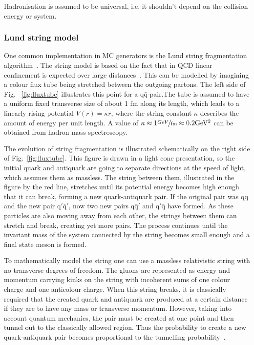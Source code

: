 Hadronisation is assumed to be universal, i.e. it shouldn't depend on the collision energy or system. 

\subsubsection*{Lund string model}

One common implementation in MC generators is the Lund string fragmentation algorithm~\cite{ANDERSSON198331}. The string model is based on the fact that in QCD linear confinement is expected over large distances~\cite{eventGenerators}. This can be modelled by imagining a colour flux tube being stretched between the outgoing partons. The left side of Fig. ~\ref{fig:fluxtube} illustrates this point for a $\mathrm{q \bar q}$-pair.The tube is assumed to have a uniform fixed transverse size of about 1 fm along its length, which leads to a linearly rising potential $V\left(r\right) = \kappa r$, where the string constant $\kappa$ describes the amount of energy per unit length. A value of $\kappa \approx 1 \mathrm{\nicefrac{GeV}{fm}} \approx 0.2 \mathrm{GeV^2}$ can be obtained from hadron mass spectroscopy.

The evolution of string fragmentation is illustrated schematically on the right side of Fig.~\ref{fig:fluxtube}. This figure is drawn in a light cone presentation, so the initial quark and antiquark are going to separate directions at the speed of light, which assumes them as massless. The string between them, illustrated in the figure by the red line, stretches until its potential energy becomes high enough that it can break, forming a new quark-antiquark pair. If the original pair was $\mathrm{q \bar q}$ and the new pair $\mathrm{q'\bar q'}$, now two new pairs $\mathrm{q \bar q'}$ and $\mathrm{q'\bar q}$ have formed. As these particles are also moving away from each other, the strings between them can stretch and break, creating yet more pairs. The process continues until the invariant mass of the system connected by the string becomes small enough and a final state meson is formed. 

To mathematically model the string one can use a massless relativistic string with no transverse degrees of freedom. The gluons are represented as energy and momentum carrying kinks on the string with incoherent sums of one colour charge and one anticolour charge. When this string breaks, it is classically required that the created quark and antiquark are produced at a certain distance if they are to have any mass or transverse momentum. However, taking into account quantum mechanics, the pair must be created at one point and then tunnel out to the classically allowed region. Thus the probability to create a new quark-antiquark pair becomes proportional to the tunnelling probability~\cite{ANDERSSON198331}.


